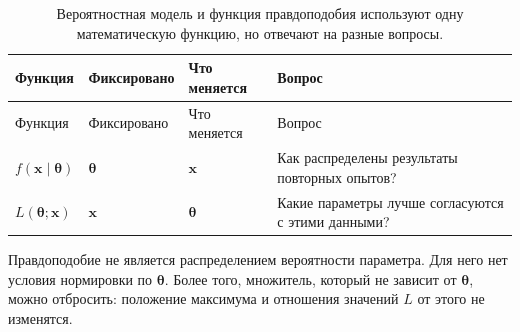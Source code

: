 \documentclass[
  russian,
  11pt,
  a4paper,
  open=any]{scrbook}
\begin{document}
\begin{longtable}[]{@{}
  >{\raggedright\arraybackslash}p{}
  >{\raggedright\arraybackslash}p{}
  >{\raggedright\arraybackslash}p{}
  >{\raggedright\arraybackslash}p{}@{}}
\caption{Вероятностная модель и функция правдоподобия используют одну
математическую функцию, но отвечают на разные
вопросы.}\label{tbl-ch9-probability-and-likelihood}\tabularnewline
\toprule\noalign{}
\begin{minipage}[b]{\linewidth}\raggedright
Функция
\end{minipage} & \begin{minipage}[b]{\linewidth}\raggedright
Фиксировано
\end{minipage} & \begin{minipage}[b]{\linewidth}\raggedright
Что меняется
\end{minipage} & \begin{minipage}[b]{\linewidth}\raggedright
Вопрос
\end{minipage} \\
\midrule\noalign{}
\endfirsthead
\toprule\noalign{}
\begin{minipage}[b]{\linewidth}\raggedright
Функция
\end{minipage} & \begin{minipage}[b]{\linewidth}\raggedright
Фиксировано
\end{minipage} & \begin{minipage}[b]{\linewidth}\raggedright
Что меняется
\end{minipage} & \begin{minipage}[b]{\linewidth}\raggedright
Вопрос
\end{minipage} \\
\midrule\noalign{}
\endhead
\bottomrule\noalign{}
\endlastfoot
\(f(\mathbf x\mid\boldsymbol\theta)\) & \(\boldsymbol\theta\) &
\(\mathbf x\) & Как распределены результаты повторных опытов? \\
\(L(\boldsymbol\theta;\mathbf x)\) & \(\mathbf x\) &
\(\boldsymbol\theta\) & Какие параметры лучше согласуются с этими
данными? \\
\end{longtable}

Правдоподобие не является распределением вероятности параметра. Для него
нет условия нормировки по \(\boldsymbol\theta\). Более того, множитель,
который не зависит от \(\boldsymbol\theta\), можно отбросить: положение
максимума и отношения значений \(L\) от этого не изменятся.
\end{document}
